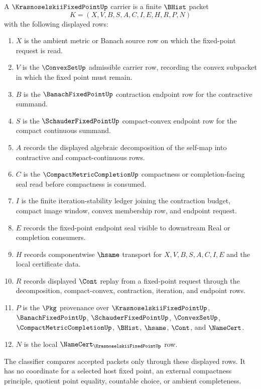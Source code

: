 \begin{definition}
\label{def:krasnoselskii-fixed-point-carrier}
A $\KrasnoselskiiFixedPointUp$ carrier is a finite $\BHist$ packet
$$
K=(X,V,B,S,A,C,I,E,H,R,P,N)
$$
with the following displayed rows:
\begin{enumerate}
\item $X$ is the ambient metric or Banach source row on which the fixed-point
request is read.
\item $V$ is the $\ConvexSetUp$ admissible carrier row, recording the convex
subpacket in which the fixed point must remain.
\item $B$ is the $\BanachFixedPointUp$ contraction endpoint row for the
contractive summand.
\item $S$ is the $\SchauderFixedPointUp$ compact-convex endpoint row for the
compact continuous summand.
\item $A$ records the displayed algebraic decomposition of the self-map into
contractive and compact-continuous rows.
\item $C$ is the $\CompactMetricCompletionUp$ compactness or completion-facing
seal read before compactness is consumed.
\item $I$ is the finite iteration-stability ledger joining the contraction
budget, compact image window, convex membership row, and endpoint request.
\item $E$ records the fixed-point endpoint seal visible to downstream Real or
completion consumers.
\item $H$ records componentwise $\hsame$ transport for $X,V,B,S,A,C,I,E$ and
the local certificate data.
\item $R$ records displayed $\Cont$ replay from a fixed-point request through
the decomposition, compact-convex, contraction, iteration, and endpoint rows.
\item $P$ is the $\Pkg$ provenance over $\KrasnoselskiiFixedPointUp$,
$\BanachFixedPointUp$, $\SchauderFixedPointUp$, $\ConvexSetUp$,
$\CompactMetricCompletionUp$, $\BHist$, $\hsame$, $\Cont$, and $\NameCert$.
\item $N$ is the local $\NameCert_{\KrasnoselskiiFixedPointUp}$ row.
\end{enumerate}
The classifier compares accepted packets only through these displayed rows. It
has no coordinate for a selected host fixed point, an external compactness
principle, quotient point equality, countable choice, or ambient completeness.
\end{definition}

